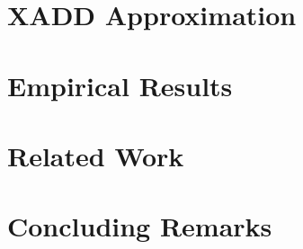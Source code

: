 \documentclass{article}
\begin{document}


\section{XADD Approximation}



\section{Empirical Results}



\section{Related Work}



\section{Concluding Remarks}







\end{document}

